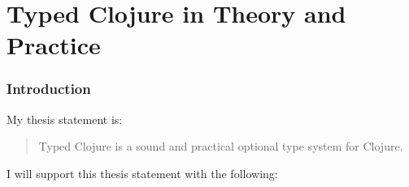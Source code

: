 \part{Typed Clojure in Theory and Practice}

\section{Introduction}

My thesis statement is:

\begin{quote}
Typed Clojure is a sound and practical optional type system for Clojure.
\end{quote}

I will support this thesis statement with the following:

